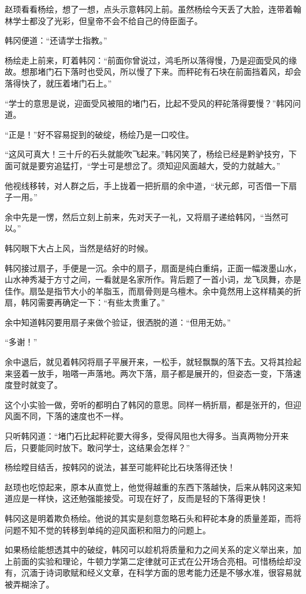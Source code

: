 赵顼看看杨绘，想了一想，点头示意韩冈上前。虽然杨绘今天丢了大脸，连带着翰林学士都没了光彩，但皇帝不会不给自己的侍臣面子。

韩冈便道：“还请学士指教。”

杨绘走上前来，盯着韩冈：“前面你曾说过，鸿毛所以落得慢，乃是迎面受风的缘故。想那堵门石下落时也受风，所以慢了下来。而秤砣有石块在前面挡着风，却会落得快了，就压着堵门石上。”

“学士的意思是说，迎面受风被阻的堵门石，比起不受风的秤砣落得要慢？”韩冈问道。

“正是！”好不容易捉到的破绽，杨绘乃是一口咬住。

“这风可真大！三十斤的石头就能吹飞起来。”韩冈笑了，杨绘已经是黔驴技穷，下面可就是要穷追猛打，“学士可是想岔了。须知迎风面越大，受的力就越大。”

他视线移转，对人群之后，手上拢着一把折扇的余中道，“状元郎，可否借一下扇子一用。”

余中先是一愣，然后立刻上前来，先对天子一礼，又将扇子递给韩冈，“当然可以。”

韩冈眼下大占上风，当然是结好的时候。

韩冈接过扇子，手便是一沉。余中的扇子，扇面是纯白重绢，正面一幅泼墨山水，山水神秀凝于方寸之间，一看就是名家所作。背后题了一首小词，龙飞凤舞，亦是佳作。扇坠是指节大小的羊脂玉，而扇骨则是乌檀木。余中竟然用上这样精美的折扇，韩冈需要再确定一下：“有些太贵重了。”

余中知道韩冈要用扇子来做个验证，很洒脱的道：“但用无妨。”

“多谢！”

余中退后，就见着韩冈将扇子平展开来，一松手，就轻飘飘的落下去。又将其捡起来竖着一放手，啪嗒一声落地。两次下落，扇子都是展开的，但姿态一变，下落速度登时就变了。

这个小实验一做，旁听的都明白了韩冈的意思。同样一柄折扇，都是张开的，但迎风面不同，下落的速度也不一样。

只听韩冈道：“堵门石比起秤砣要大得多，受得风阻也大得多。当真两物分开来后，只要能同时放下。敢问学士，这结果会怎样？”

杨绘瞠目结舌，按韩冈的说法，甚至可能秤砣比石块落得还快！

赵顼也吃惊起来，原本从直觉上，他觉得越重的东西下落越快，后来从韩冈这来知道应是一样快，这还勉强能接受。可现在好了，反而是轻的下落得更快！

韩冈这是明着欺负杨绘。他说的其实是刻意忽略石头和秤砣本身的质量差距，而将问题不知不觉的转移到单纯的迎风面积和阻力的问题上。

如果杨绘能想透其中的破绽，韩冈可以趁机将质量和力之间关系的定义举出来，加上前面的实验和理论，牛顿力学第二定律就可正式在公开场合亮相。可惜杨绘却没有，沉湎于诗词歌赋和经义文章，在科学方面的思考能力还是不够水准，很容易就被弄糊涂了。

